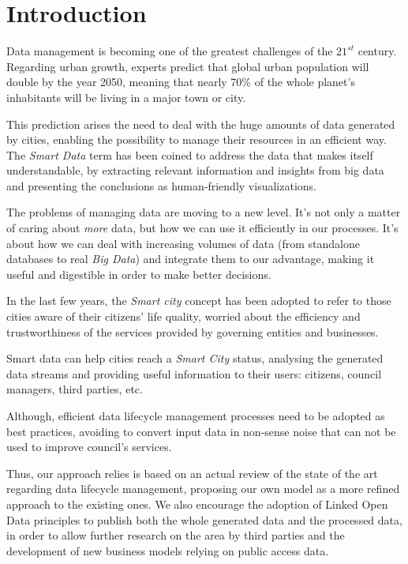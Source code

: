 \section{Introduction}


Data management is becoming one of the greatest challenges of the $21^{st}$ century. Regarding urban growth, experts predict that global urban population will double by the year 2050, meaning that nearly 70\% of the whole planet's inhabitants will be living in a major town or city.

This prediction arises the need to deal with the huge amounts of data generated by cities, enabling the possibility to manage their resources in an efficient way. The \textit{Smart Data} term has been coined to address the data that makes itself understandable, by extracting relevant information and insights from big data and presenting the conclusions as human-friendly visualizations.

The problems of managing data are moving to a new level. It's not only a matter of caring about \textit{more} data, but how we can use it efficiently in our processes. It's about how we can deal with increasing volumes of data (from standalone databases to real \textit{Big Data}) and integrate them to our advantage, making it useful and digestible in order to make better decisions.

In the last few years, the \textit{Smart city} concept has been adopted to refer to those cities aware of their citizens' life quality, worried about the efficiency and trustworthiness of the services provided by governing entities and businesses.

Smart data can help cities reach a \textit{Smart City} status, analysing the generated data streams and providing useful information to their users: citizens, council managers, third parties, etc.

Although, efficient data lifecycle management processes need to be adopted as best practices, avoiding to convert input data in non-sense noise that can not be used to improve council's services.

Thus, our approach relies is based on an actual review of the state of the art regarding data lifecycle management, proposing our own model as a more refined approach to the existing ones. We also encourage the adoption of Linked Open Data principles to publish both the whole generated data and the processed data, in order to allow further research on the area by third parties and the development of new business models relying on public access data.